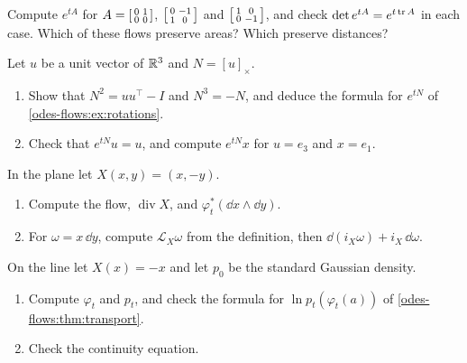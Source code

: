 \begin{notechapter}
\begin{exercise}\label{odes-flows:exr:2}
Compute $e^{tA}$ for
$A = \begin{bsmallmatrix}0 & 1\\ 0 & 0\end{bsmallmatrix}$,
$\begin{bsmallmatrix}0 & -1\\ 1 & 0\end{bsmallmatrix}$ and
$\begin{bsmallmatrix}1 & 0\\ 0 & -1\end{bsmallmatrix}$, and check
$\det e^{tA} = e^{t\operatorname{tr} A}$ in each case. Which of these flows preserve
areas? Which preserve distances?
\end{exercise}

\begin{exercise}\label{odes-flows:exr:3}
Let $u$ be a unit vector of $\mathbb{R}^3$ and $N = [u]_\times$.
\begin{enumerate}[nosep]
  \item Show that $N^2 = uu^\top - I$ and $N^3 = -N$, and deduce the
        formula for $e^{tN}$ of \cref{odes-flows:ex:rotations}.
  \item Check that $e^{tN}u = u$, and compute $e^{tN}x$ for
        $u = e_3$ and $x = e_1$.
\end{enumerate}
\end{exercise}

\begin{exercise}\label{odes-flows:exr:4}
In the plane let $X(x, y) = (x, -y)$.
\begin{enumerate}[nosep]
  \item Compute the flow, $\operatorname{div}X$, and
        $\varphi_t^*(\dd x\wedge\dd y)$.
  \item For $\omega = x\,\dd y$, compute $\mathcal L_X\omega$ from the
        definition, then $\dd(i_X\omega) + i_X\,\dd\omega$.
\end{enumerate}
\end{exercise}

\begin{exercise}\label{odes-flows:exr:5}
On the line let $X(x) = -x$ and let $p_0$ be the standard Gaussian
density.
\begin{enumerate}[nosep]
  \item Compute $\varphi_t$ and $p_t$, and check the formula for
        $\ln p_t(\varphi_t(a))$ of
        \cref{odes-flows:thm:transport}.
  \item Check the continuity equation.
\end{enumerate}
\end{exercise}


\end{notechapter}
